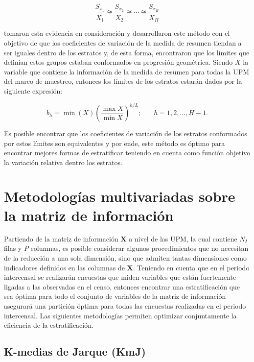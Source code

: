 \documentclass[
  12pt,
  spanish,
]{book}
\begin{document}
\[
\frac{S_{x_1}}{\bar{X}_1} \cong \frac{S_{x_2}}{\bar{X}_2} \cong \cdots \cong\frac{S_{x_H}}{\bar{X}_H}  
\]

\citet{Gunning_Horgan_2004} tomaron esta evidencia en consideración y desarrollaron este método con el objetivo de que los coeficientes de variación de la medida de resumen tiendan a ser iguales dentro de los estratos y, de esta forma, encontraron que los límites que definían estos grupos estaban conformados en progresión geométrica. Siendo \(X\) la variable que contiene la información de la medida de resumen para todas la UPM del marco de muestreo, entonces los límites de los estratos estarán dados por la siguiente expresión:

\[
b_h = \min(X) \left( \frac{\max X}{\min X} \right) ^ {h/L}; \ \ \ \ \ \ \ \ h = 1, 2, \ldots, H-1.
\]

Es posible encontrar que los coeficientes de variación de los estratos conformados por estos límites son equivalentes y por ende, este método es óptimo para encontrar mejores formas de estratificar teniendo en cuenta como función objetivo la variación relativa dentro los estratos.

\hypertarget{metodologuxedas-multivariadas-sobre-la-matriz-de-informaciuxf3n}{%
\section{Metodologías multivariadas sobre la matriz de información}\label{metodologuxedas-multivariadas-sobre-la-matriz-de-informaciuxf3n}}

Partiendo de la matriz de información \(\mathbf{X}\) a nivel de las UPM, la cual contiene \(N_I\) filas y \(P\) columnas, es posible considerar algunos procedimientos que no necesitan de la reducción a una sola dimensión, sino que admiten tantas dimensiones como indicadores definidos en las columnas de \(\mathbf{X}\). Teniendo en cuenta que en el periodo intercensal se realizarán encuestas que miden variables que están fuertemente ligadas a las observadas en el censo, entonces encontrar una estratificación que sea óptima para todo el conjunto de variables de la matriz de información asegurará una partición óptima para todas las encuestas realizadas en el periodo intercensal. Las siguientes metodologías permiten optimizar conjuntamente la eficiencia de la estratificación.

\hypertarget{k-medias-de-jarque-kmj}{%
\subsection{K-medias de Jarque (KmJ)}\label{k-medias-de-jarque-kmj}}
\end{document}
